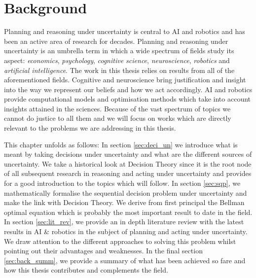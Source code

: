 \chapter{Background}

Planning and reasoning under uncertainty is central to AI and robotics and has 
been an active area of research for decades. Planning and reasoning under uncertainty is an umbrella term in which a
wide spectrum of fields study its aspect: \textit{economics}, \textit{psychology}, \textit{cognitive science}, \textit{neuroscience},
\textit{robotics} and \textit{artificial intelligence}. 
The work in this thesis relies on results from all of the aforementioned fields. Cognitive and neuroscience 
bring justification and insight into the way we represent our beliefs and how we act accordingly. AI and
robotics provide computational models and optimisation methods which take into account insights attained in the sciences.
Because of the vast spectrum of topics we cannot do justice to all them and we will focus on works which are directly 
relevant to the problems we are addressing in this thesis.



This chapter unfolds as follows: In section \ref{sec:deci_un} we introduce what is meant by taking decisions under uncertainty
and what are the different sources of uncertainty. We take a historical look at Decision Theory since it is the root node of all subsequent
research in reasoning and acting under uncertainty and provides for a good introduction to the topics which will follow. 
In section \ref{sec:sqp}, we mathematically formalise the sequential decision problem under uncertainty and make the link 
with Decision Theory. We derive from first principal the Bellman optimal equation which is probably the most important result to 
date in the field.
In section \ref{sec:lit_rev}, we provide an in depth literature review with the latest results in AI \& robotics in the subject 
of planning and acting under uncertainty. We draw attention to the different approaches to solving this problem whilst pointing out
their advantages and weaknesses. 
In the final section \ref{sec:back_summ}, we provide a summary of what has been achieved so fare and how this thesis contributes and complements 
the field. 


